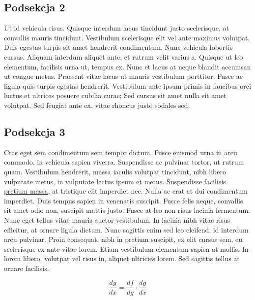 \documentclass[12pt]{article}
\begin{document}
\subsection*{Podsekcja 2}
Ut id vehicula risus. Quisque interdum lacus tincidunt justo scelerisque, at convallis mauris tincidunt. Vestibulum scelerisque elit vel ante maximus volutpat. Duis egestas turpis sit amet hendrerit condimentum. Nunc vehicula lobortis cursus. Aliquam interdum aliquet ante, et rutrum velit varius a. Quisque ut leo elementum, facilisis urna ut, tempus ex. Nunc et lacus at neque blandit accumsan ut congue metus. Praesent vitae lacus ut mauris vestibulum porttitor. Fusce ac ligula quis turpis egestas hendrerit. Vestibulum ante ipsum primis in faucibus orci luctus et ultrices posuere cubilia curae; Sed cursus sit amet nulla sit amet volutpat. Sed feugiat ante ex, vitae rhoncus justo sodales sed. 
\subsection*{Podsekcja 3}
 Cras eget sem condimentum sem tempor dictum. Fusce euismod urna in arcu commodo, in vehicula sapien viverra. Suspendisse ac pulvinar tortor, ut rutrum quam. Vestibulum hendrerit, massa iaculis volutpat tincidunt, nibh libero vulputate metus, in vulputate lectus ipsum et metus. \underline{Suspendisse facilisis pretium massa}, at tristique elit imperdiet nec. Nulla ac erat at dui condimentum imperdiet. Duis tempus sapien in venenatis suscipit. Fusce felis neque, convallis sit amet odio non, suscipit mattis justo. Fusce at leo non risus lacinia fermentum. Nunc eget tellus vitae mauris auctor vestibulum. In lacinia nibh vitae risus efficitur, at ornare ligula dictum. Nunc sagittis enim sed leo eleifend, id interdum arcu pulvinar. Proin consequat, nibh in pretium suscipit, ex elit cursus sem, eu scelerisque ex ante vitae lorem. Etiam vestibulum elementum sapien at mollis. In lorem libero, volutpat vel risus in, aliquet ultricies lorem. Sed sagittis tellus at ornare facilisis.
 
 \[ \frac{dy}{dx} = \frac{df}{dg} \cdot \frac{dg}{dx} \]
\end{document}
